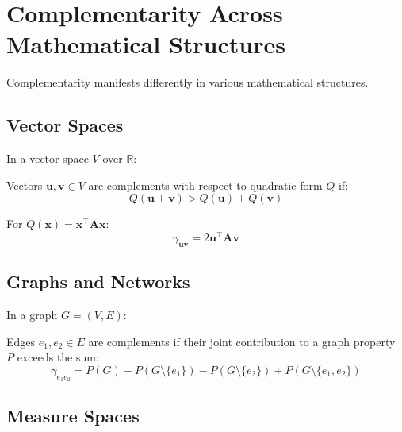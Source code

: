 \section{Complementarity Across Mathematical Structures}
\label{sec:structures}

Complementarity manifests differently in various mathematical structures.

\subsection{Vector Spaces}

In a vector space $V$ over $\mathbb{R}$:

\begin{definition}
Vectors $\mathbf{u}, \mathbf{v} \in V$ are complements with respect to quadratic form $Q$ if:
\begin{equation}
Q(\mathbf{u} + \mathbf{v}) > Q(\mathbf{u}) + Q(\mathbf{v})
\end{equation}
\end{definition}

For $Q(\mathbf{x}) = \mathbf{x}^\top \mathbf{A} \mathbf{x}$:
\begin{equation}
\gamma_{\mathbf{u}\mathbf{v}} = 2 \mathbf{u}^\top \mathbf{A} \mathbf{v}
\end{equation}

\subsection{Graphs and Networks}

In a graph $G = (V, E)$:

\begin{definition}
Edges $e_1, e_2 \in E$ are complements if their joint contribution to a graph property $P$ exceeds the sum:
\begin{equation}
\gamma_{e_1 e_2} = P(G) - P(G \setminus \{e_1\}) - P(G \setminus \{e_2\}) + P(G \setminus \{e_1, e_2\})
\end{equation}
\end{definition}

\subsection{Measure Spaces}

